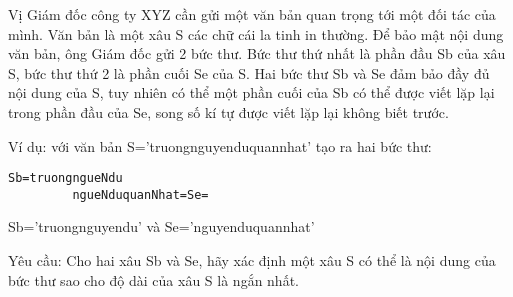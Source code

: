 Vị Giám đốc công ty XYZ cần gửi một văn bản quan trọng tới một đối tác của mình. Văn bản là một xâu S các chữ cái la tinh in thường. Để bảo mật nội dung văn bản, ông Giám đốc gửi 2 bức thư. Bức thư thứ nhất là phần đầu Sb của xâu S, bức thư thứ 2 là phần cuối Se của S.  Hai bức thư Sb và Se đảm bảo đầy đủ nội dung của S, tuy nhiên có thể một phần cuối của Sb có thể được viết lặp lại trong phần đầu của Se, song số kí tự được viết lặp lại không biết trước.  

   Ví dụ: với văn bản S=’truongnguyenduquannhat’ tạo ra hai bức thư:  
\begin{verbatim}
Sb=truongngueNdu
         ngueNduquanNhat=Se=
\end{verbatim}

   Sb=’truongnguyendu’ và Se=’nguyenduquannhat’  

   Yêu cầu: Cho hai xâu Sb và Se, hãy xác định một xâu S có thể là nội dung của bức thư sao cho độ dài của xâu S là ngắn nhất.